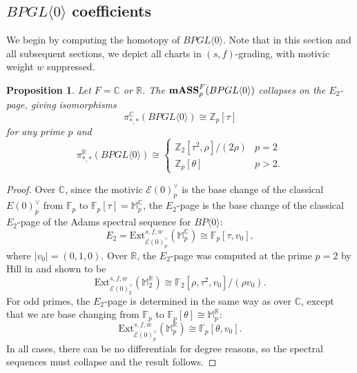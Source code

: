 \documentclass{amsart}
\newtheorem{proposition}[theorem]{Proposition}
\theoremstyle{plain}
\numberwithin{theorem}{section}
\numberwithin{equation}{section}
\numberwithin{figure}{section}
\newcommand{\0}{\langle 0 \rangle }
\begin{document}
\subsection{$BPGL\langle 0 \rangle$ coefficients}
We begin by computing the homotopy of $BPGL\langle 0 \rangle$. Note that in this section and all subsequent sections, we depict all charts in $(s,f)$-grading, with motivic weight $w$ suppressed.
\begin{proposition}
\label{mass BPGL0 C and R}
    Let $F = \mathbb{C}$ or $\mathbb{R}$. The $\textup{\textbf{mASS}}_p^F(BPGL \langle 0 \rangle)$ collapses on the $E_2$-page, giving isomorphisms
    \[\pi_{*,*}^\mathbb{C}(BPGL \langle 0 \rangle) \cong \mathbb{Z}_p[\tau]\]
    for any prime $p$ and
    \[ \pi_{*,*}^\mathbb{R}(BPGL \langle 0 \rangle) \cong\left\{\begin{array}{ll}
       \mathbb{Z}_2[\tau^2, \rho]/(2\rho)  & p=2  \\
       \mathbb{Z}_p[\theta]  & p>2.
    \end{array} \right.\]
\end{proposition}

\begin{proof}
    Over $\mathbb{C}$, since the motivic $\mathcal{E}(0)^\vee_p$ is the base change of the classical $E(0)^\vee_p$ from $\mathbb{F}_p$ to $\mathbb{F}_p[\tau] = \mathbb{M}_p^\mathbb{C}$, the $E_2$-page is the base change of the classical $E_2$-page of the Adams spectral sequence for $BP\langle 0 \rangle$:
    \[E_2 = \text{Ext}^{s,f,w}_{\mathcal{E}(0)^\vee_p}(\mathbb{M}_p^{\mathbb{C}}) \cong \mathbb{F}_p[\tau, v_0],\]
    where $|v_0| = (0,1,0).$ Over $\mathbb{R}$, the $E_2$-page was computed at the prime $p=2$ by Hill in \cite[Theorem 3.1]{Hill11} and shown to be
    \[\text{Ext}^{s,f,w}_{\mathcal{E}(0)^\vee_2}(\mathbb{M}_2^\mathbb{R}) \cong \mathbb{F}_2[\rho, \tau^2, v_0]/(\rho v_0).\]
    For odd primes, the $E_2$-page is determined in the same way as over $\mathbb{C}$, except that we are base changing from $\mathbb{F}_p$ to $\mathbb{F}_p[\theta] \cong \mathbb{M}_p^\mathbb{R}$:
    \[\text{Ext}^{s,f,w}_{\mathcal{E}(0)^\vee_p}(\mathbb{M}_p^\mathbb{R}) \cong \mathbb{F}_p[\theta, v_0].\]
    In all cases, there can be no differentials for degree reasons, so the spectral sequences must collapse and the result follows.
\end{proof}
\end{document}
